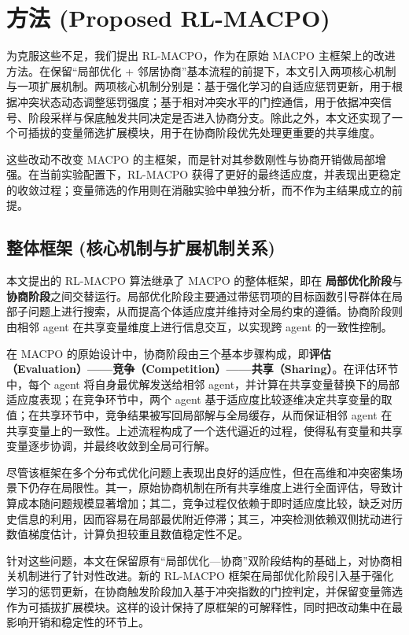 \documentclass[conference]{IEEEtran}
\begin{document}
\section{方法 (Proposed RL-MACPO)}\label{ux65b9ux6cd5-proposed-rl-macpo}

为克服这些不足，我们提出 RL-MACPO，作为在原始 MACPO 主框架上的改进方法。在保留“局部优化 + 邻居协商”基本流程的前提下，本文引入两项核心机制与一项扩展机制。两项核心机制分别是：基于强化学习的自适应惩罚更新，用于根据冲突状态动态调整惩罚强度；基于相对冲突水平的门控通信，用于依据冲突信号、阶段采样与保底触发共同决定是否进入协商分支。除此之外，本文还实现了一个可插拔的变量筛选扩展模块，用于在协商阶段优先处理更重要的共享维度。

这些改动不改变 MACPO 的主框架，而是针对其参数刚性与协商开销做局部增强。在当前实验配置下，RL-MACPO 获得了更好的最终适应度，并表现出更稳定的收敛过程；变量筛选的作用则在消融实验中单独分析，而不作为主结果成立的前提。

\subsection{整体框架 (核心机制与扩展机制关系)}\label{ux6574ux4f53ux6846ux67b6-ux7b80ux8981ux4ecbux7ecdux4e09ux5927ux6539ux8fdbux673aux5236ux53caux5176ux5173ux7cfb}

本文提出的 RL-MACPO 算法继承了 MACPO 的整体框架，即在
\textbf{局部优化阶段}与\textbf{协商阶段}之间交替运行。局部优化阶段主要通过带惩罚项的目标函数引导群体在局部子问题上进行搜索，从而提高个体适应度并维持对全局约束的遵循。协商阶段则由相邻
agent 在共享变量维度上进行信息交互，以实现跨 agent 的一致性控制。

在 MACPO
的原始设计中，协商阶段由三个基本步骤构成，即\textbf{评估（Evaluation）------竞争（Competition）------共享（Sharing）}。在评估环节中，每个
agent 将自身最优解发送给相邻
agent，并计算在共享变量替换下的局部适应度表现；在竞争环节中，两个 agent
基于适应度比较逐维决定共享变量的取值；在共享环节中，竞争结果被写回局部解与全局缓存，从而保证相邻
agent
在共享变量上的一致性。上述流程构成了一个迭代逼近的过程，使得私有变量和共享变量逐步协调，并最终收敛到全局可行解。

尽管该框架在多个分布式优化问题上表现出良好的适应性，但在高维和冲突密集场景下仍存在局限性。其一，原始协商机制在所有共享维度上进行全面评估，导致计算成本随问题规模显著增加；其二，竞争过程仅依赖于即时适应度比较，缺乏对历史信息的利用，因而容易在局部最优附近停滞；其三，冲突检测依赖双侧扰动进行数值梯度估计，计算负担较重且数值稳定性不足。

针对这些问题，本文在保留原有“局部优化—协商”双阶段结构的基础上，对协商相关机制进行了针对性改进。新的 RL-MACPO 框架在局部优化阶段引入基于强化学习的惩罚更新，在协商触发阶段加入基于冲突指数的门控判定，并保留变量筛选作为可插拔扩展模块。这样的设计保持了原框架的可解释性，同时把改动集中在最影响开销和稳定性的环节上。
\end{document}
